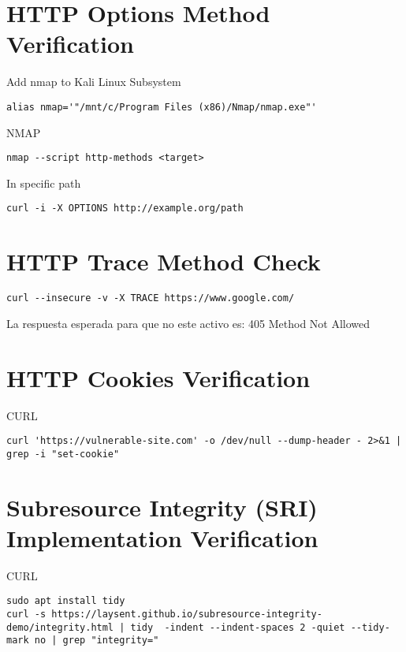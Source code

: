 \section{HTTP Options Method Verification}

Add nmap to Kali Linux Subsystem
\begin{lstlisting}[numbers=none]
alias nmap='"/mnt/c/Program Files (x86)/Nmap/nmap.exe"'
\end{lstlisting}

NMAP
\begin{lstlisting}[numbers=none]
nmap --script http-methods <target>
\end{lstlisting}

In specific path
\begin{lstlisting}[numbers=none]
curl -i -X OPTIONS http://example.org/path
\end{lstlisting}

\section{HTTP Trace Method Check}

\begin{lstlisting}[numbers=none]
curl --insecure -v -X TRACE https://www.google.com/
\end{lstlisting}

La respuesta esperada para que no este activo es: 405 Method Not Allowed

\section{HTTP Cookies Verification}

CURL
\begin{lstlisting}[numbers=none]
curl 'https://vulnerable-site.com' -o /dev/null --dump-header - 2>&1 | grep -i "set-cookie"
\end{lstlisting}

\section{Subresource Integrity (SRI)  Implementation Verification}

CURL
\begin{lstlisting}[numbers=none]
sudo apt install tidy
curl -s https://laysent.github.io/subresource-integrity-demo/integrity.html | tidy  -indent --indent-spaces 2 -quiet --tidy-mark no | grep "integrity="
\end{lstlisting}


